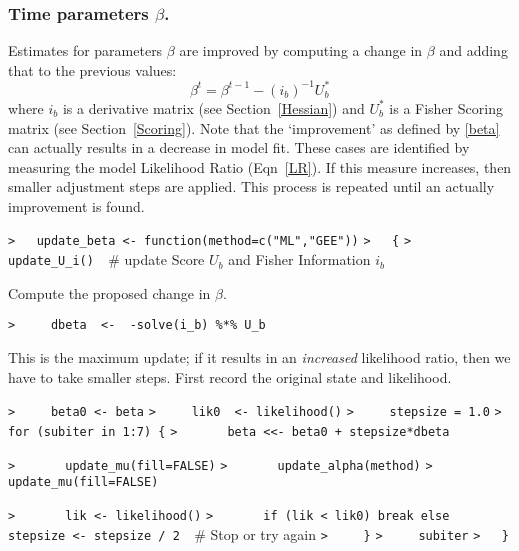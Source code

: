 \documentclass[a4paper]{article}
\begin{document}
\subsubsection{Time parameters $\beta$.}
Estimates for parameters $\beta$ are improved by computing a change in $\beta$ and
adding that to the previous values:
$$ \beta^t = \beta^{t-1} - (i_b)^{-1} U_b^\ast \label{beta}$$
where $i_b$ is a derivative matrix (see Section~\ref{Hessian})
and $U_b^\ast$ is a Fisher Scoring matrix (see Section~\ref{Scoring}).
Note that the `improvement' as defined by \eqref{beta} can actually results in a decrease in model fit.
These cases are identified by measuring the model Likelihood Ratio (Eqn~\eqref{LR}).
If this measure increases, then smaller adjustment steps are applied.
This process is repeated until an actually improvement is found.\par
\verb~>   update_beta <- function(method=c("ML","GEE"))~\newline
\verb~>   {~\newline
\verb~>     update_U_i()  ~{\sffamily\# update Score $U_b$ and Fisher Information $i_b$}\par

Compute the proposed change in $\beta$.\par
\verb~>     dbeta  <-  -solve(i_b) %*% U_b~\par

This is the maximum update; if it results in an \emph{increased} likelihood ratio,
then we have to take smaller steps. First record the original state and likelihood.\par
\verb~>     beta0 <- beta~\newline
\verb~>     lik0  <- likelihood()~\newline
\verb~>     stepsize = 1.0~\newline
\verb~>     for (subiter in 1:7) {~\newline
\verb~>       beta <<- beta0 + stepsize*dbeta~\par

\verb~>       update_mu(fill=FALSE)~\newline
\verb~>       update_alpha(method)~\newline
\verb~>       update_mu(fill=FALSE)~\par

\verb~>       lik <- likelihood()~\newline
\verb~>       if (lik < lik0) break else stepsize <- stepsize / 2  ~{\sffamily\# Stop or try again}\newline
\verb~>     }~\newline
\verb~>     subiter~\newline
\verb~>   }~\par
\end{document}
